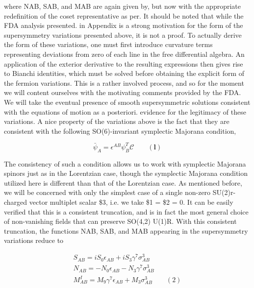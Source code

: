 \documentclass{article}
\begin{document}
\sloppy

where NAB, SAB, and MAB are again given by, but now with the appropriate redefinition
of the coset representative as per. It should be noted that while the FDA analysis presented.
in Appendix is a strong motivation for the form of the supersymmetry variations presented
above, it is not a proof. To actually derive the form of these variations, one must first
introduce curvature terms representing deviations from zero of each line in the free differential
algebra. An application of the exterior derivative to the resulting expressions then gives rise
to Bianchi identities, which must be solved before obtaining the explicit form of the fermion
variations. This is a rather involved process, and so for the moment we will content ourselves
with the motivating comments provided by the FDA. We will take the eventual presence of
smooth supersymmetric solutions consistent with the equations of motion as a posteriori.
evidence for the legitimacy of these variations. A nice property of the variations above is
the fact that they are consistent with the following SO(6)-invariant symplectic Majorana
condition,


\begin{equation}
\bar { \psi } _ { A } = \epsilon ^ { A B } \psi _ { B } ^ { T } \mathcal { C } \qquad ( \mathbf { l } )
\end{equation}


The consistency of such a condition allows us to work with symplectic Majorana spinors just
as in the Lorentzian case, though the symplectic Majorana condition utilized here is different
than that of the Lorentzian case. As mentioned before, we will be concerned with only the
simplest case of a single non-zero SU(2)r-charged vector multiplet scalar \$3, i.e. we take
\$1 = \$2 = 0. It can be easily verified that this is a consistent truncation, and is in fact the
most general choice of non-vanishing fields that can preserve SO(4,2)  U(1)R. With this
consistent truncation, the functions NAB, SAB, and MAB appearing in the supersymmetry
variations reduce to


\begin{equation}
\begin{array} { c } { S _ { A B } = i S _ { 0 } \epsilon _ { A B } + i S _ { 3 } \gamma ^ { 7 } \sigma _ { A B } ^ { 3 } } \\ { N _ { A B } = - N _ { 0 } \epsilon _ { A B } - N _ { 3 } \gamma ^ { 7 } \sigma _ { A B } ^ { 3 } } \\ { M _ { A B } ^ { I } = M _ { 9 } \gamma ^ { 7 } \epsilon _ { A B } + M _ { 3 } \sigma _ { A B } ^ { 3 } \qquad ( 2 ) } \end{array}
\end{equation}
\end{document}
